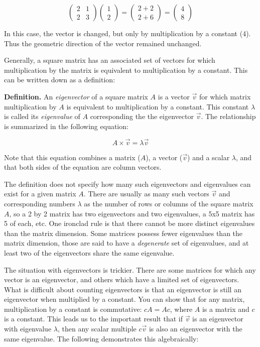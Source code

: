 \documentclass[
  letterpaper,
  DIV=11,
  numbers=noendperiod]{scrreprt}
\begin{document}
\[
\left(\begin{array}{cc}2 & 1 \\ 2& 3\end{array}\right)\left(\begin{array}{c}1 \\ 2 \end{array}\right) = \left(\begin{array}{c}2 +2 \\ 2 + 6 \end{array}\right) =  \left(\begin{array}{c} 4 \\ 8 \end{array}\right)
\]

In this case, the vector is changed, but only by multiplication by a
constant (4). Thus the geometric direction of the vector remained
unchanged.

Generally, a square matrix has an associated set of vectors for which
multiplication by the matrix is equivalent to multiplication by a
constant. This can be written down as a definition:

\textbf{Definition.} An \emph{eigenvector} of a square matrix \(A\) is a
vector \(\vec v\) for which matrix multiplication by \(A\) is equivalent
to multiplication by a constant. This constant \(\lambda\) is called its
\emph{eigenvalue} of \(A\) corresponding the the eigenvector \(\vec v\).
The relationship is summarized in the following equation:

\[
A  \times  \vec v = \lambda \vec v
\]

Note that this equation combines a matrix (\(A\)), a vector (\(\vec v\))
and a scalar \(\lambda\), and that both sides of the equation are column
vectors.

The definition does not specify how many such eigenvectors and
eigenvalues can exist for a given matrix \(A\). There are usually as
many such vectors \(\vec v\) and corresponding numbers \(\lambda\) as
the number of rows or columns of the square matrix \(A\), so a 2 by 2
matrix has two eigenvectors and two eigenvalues, a 5x5 matrix has 5 of
each, etc. One ironclad rule is that there cannot be more distinct
eigenvalues than the matrix dimension. Some matrices possess fewer
eigenvalues than the matrix dimension, those are said to have a
\emph{degenerate} set of eigenvalues, and at least two of the
eigenvectors share the same eigenvalue.

The situation with eigenvectors is trickier. There are some matrices for
which any vector is an eigenvector, and others which have a limited set
of eigenvectors. What is difficult about counting eigenvectors is that
an eigenvector is still an eigenvector when multiplied by a constant.
You can show that for any matrix, multiplication by a constant is
commutative: \(cA = Ac\), where \(A\) is a matrix and \(c\) is a
constant. This leads us to the important result that if \(\vec v\) is an
eigenvector with eigenvalue \(\lambda\), then any scalar multiple
\(c \vec v\) is also an eigenvector with the same eigenvalue. The
following demonstrates this algebraically:
\end{document}
